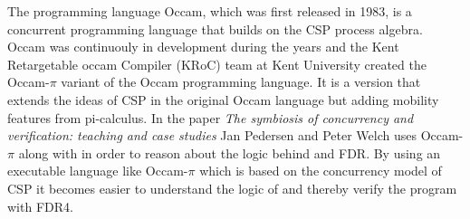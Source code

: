 The programming language Occam\cite{Occam1995}, which was first released in 1983, is a concurrent programming language that builds on the CSP process algebra. Occam was continuouly in development during the years and the Kent Retargetable occam Compiler (KRoC) team at Kent University created the Occam-$\pi$\cite{UniveristyofKent} variant of the Occam programming language. It is a version that extends the ideas of CSP in the original Occam language but adding mobility features from pi-calculus. In the paper \textit{The symbiosis of concurrency and verification: teaching and case studies}\cite{Pedersen2018} Jan Pedersen and Peter Welch uses Occam-$\pi$ along with \cspm in order to reason about the logic behind \cspm and FDR. By using an executable language like Occam-$\pi$ which is based on the concurrency model of CSP it becomes easier to understand the logic of \cspm and thereby verify the program with FDR4.\\\\

